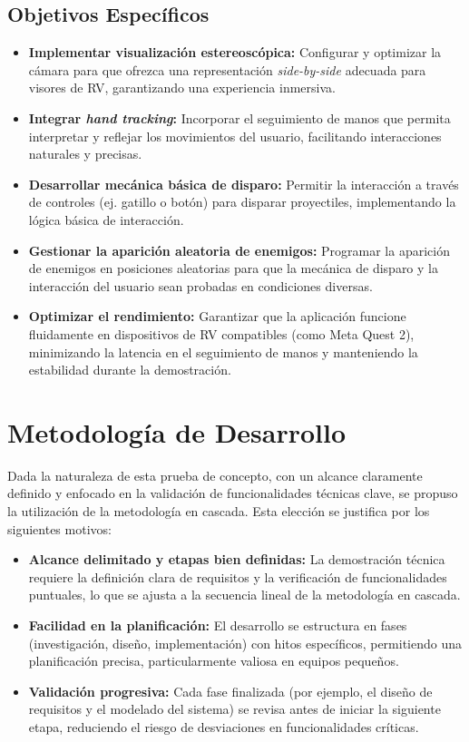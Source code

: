 \documentclass[journal,article,accept,pdftex,moreauthors]{Definitions/mdpi}
\begin{document}
\subsection{Objetivos Específicos}
\begin{itemize}
    \item \textbf{Implementar visualización estereoscópica:} Configurar y optimizar la cámara para que ofrezca una representación \textit{side-by-side} adecuada para visores de RV, garantizando una experiencia inmersiva.
    \item \textbf{Integrar \textit{hand tracking}:} Incorporar el seguimiento de manos que permita interpretar y reflejar los movimientos del usuario, facilitando interacciones naturales y precisas.
    \item \textbf{Desarrollar mecánica básica de disparo:} Permitir la interacción a través de controles (ej. gatillo o botón) para disparar proyectiles, implementando la lógica básica de interacción.
    \item \textbf{Gestionar la aparición aleatoria de enemigos:} Programar la aparición de enemigos en posiciones aleatorias para que la mecánica de disparo y la interacción del usuario sean probadas en condiciones diversas.
    \item \textbf{Optimizar el rendimiento:} Garantizar que la aplicación funcione fluidamente en dispositivos de RV compatibles (como Meta Quest 2), minimizando la latencia en el seguimiento de manos y manteniendo la estabilidad durante la demostración.
\end{itemize}


\section{Metodología de Desarrollo}
Dada la naturaleza de esta prueba de concepto, con un alcance claramente definido y enfocado en la validación de funcionalidades técnicas clave, se propuso la utilización de la metodología en cascada. Esta elección se justifica por los siguientes motivos:

\begin{itemize}
    \item \textbf{Alcance delimitado y etapas bien definidas:} La demostración técnica requiere la definición clara de requisitos y la verificación de funcionalidades puntuales, lo que se ajusta a la secuencia lineal de la metodología en cascada.
    \item \textbf{Facilidad en la planificación:} El desarrollo se estructura en fases (investigación, diseño, implementación) con hitos específicos, permitiendo una planificación precisa, particularmente valiosa en equipos pequeños.
    \item \textbf{Validación progresiva:} Cada fase finalizada (por ejemplo, el diseño de requisitos y el modelado del sistema) se revisa antes de iniciar la siguiente etapa, reduciendo el riesgo de desviaciones en funcionalidades críticas.
\end{itemize}
\end{document}
